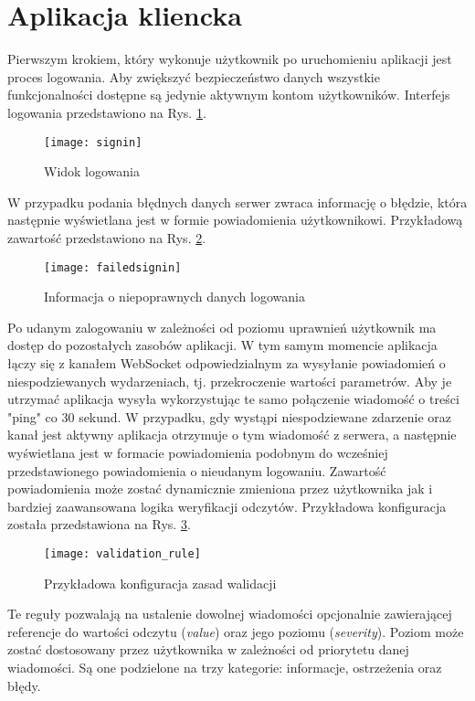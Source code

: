 \section{Aplikacja kliencka}
Pierwszym krokiem, który wykonuje użytkownik po uruchomieniu aplikacji jest 
proces logowania. Aby zwiększyć bezpieczeństwo danych wszystkie funkcjonalności
dostępne są jedynie aktywnym kontom użytkowników.
Interfejs logowania przedstawiono na Rys. \ref{atmosphere:signin}.
\begin{figure}[h!]
  \centering
  \texttt{[image: signin]}
  \caption{Widok logowania}
  \label{atmosphere:signin}
\end{figure}
W przypadku podania błędnych danych serwer zwraca informację o błędzie, która następnie
wyświetlana jest w formie powiadomienia użytkownikowi. Przykładową zawartość przedstawiono
na Rys. \ref{atmosphere:failedsignin}.
\begin{figure}[h!]
  \centering
  \texttt{[image: failedsignin]}
  \caption{Informacja o niepoprawnych danych logowania}
  \label{atmosphere:failedsignin}
\end{figure}
Po udanym zalogowaniu w zależności od poziomu uprawnień użytkownik ma dostęp
do pozostałych zasobów aplikacji.
W tym samym momencie aplikacja łączy się z kanałem WebSocket odpowiedzialnym za
wysyłanie powiadomień o niespodziewanych wydarzeniach, tj. przekroczenie
wartości parametrów. Aby je utrzymać aplikacja wysyła wykorzystując te samo
połączenie wiadomość o treści "ping" co 30 sekund. W przypadku, gdy
wystąpi niespodziewane zdarzenie oraz kanał jest aktywny aplikacja otrzymuje
o tym wiadomość z serwera, a następnie wyświetlana jest w formacie powiadomienia
podobnym do wcześniej przedstawionego powiadomienia o nieudanym logowaniu.
Zawartość powiadomienia może zostać dynamicznie zmieniona przez użytkownika
jak i bardziej zaawansowana logika weryfikacji odczytów. Przykładowa konfiguracja
została przedstawiona na Rys. \ref{atmosphere:validation_rule}.
\begin{figure}[h!]
  \centering
  \texttt{[image: validation\_rule]}
  \caption{Przykładowa konfiguracja zasad walidacji}
  \label{atmosphere:validation_rule}
\end{figure}
Te reguły pozwalają na ustalenie dowolnej wiadomości opcjonalnie zawierającej referencje
do wartości odczytu (\textit{value}) oraz jego poziomu (\textit{severity}). Poziom może zostać
dostosowany przez użytkownika w zależności od priorytetu danej wiadomości.
Są one podzielone na trzy kategorie: informacje, ostrzeżenia oraz błędy.
